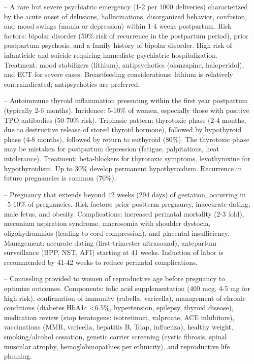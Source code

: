 -- A rare but severe psychiatric emergency (1-2 per 1000 deliveries) characterized by the acute onset of delusions, hallucinations, disorganized behavior, confusion, and mood swings (mania or depression) within 1-4 weeks postpartum. Risk factors: bipolar disorder (50\% risk of recurrence in the postpartum period), prior postpartum psychosis, and a family history of bipolar disorder. High risk of infanticide and suicide requiring immediate psychiatric hospitalization. Treatment: mood stabilizers (lithium), antipsychotics (olanzapine, haloperidol), and ECT for severe cases. Breastfeeding considerations: lithium is relatively contraindicated; antipsychotics are preferred.

-- Autoimmune thyroid inflammation presenting within the first year postpartum (typically 2-6 months). Incidence: 5-10\% of women, especially those with positive TPO antibodies (50-70\% risk). Triphasic pattern: thyrotoxic phase (2-4 months, due to destructive release of stored thyroid hormone), followed by hypothyroid phase (4-8 months), followed by return to euthyroid (80\%). The thyrotoxic phase may be mistaken for postpartum depression (fatigue, palpitations, heat intolerance). Treatment: beta-blockers for thyrotoxic symptoms, levothyroxine for hypothyroidism. Up to 30\% develop permanent hypothyroidism. Recurrence in future pregnancies is common (70\%).

-- Pregnancy that extends beyond 42 weeks (294 days) of gestation, occurring in ~5-10\% of pregnancies. Risk factors: prior postterm pregnancy, inaccurate dating, male fetus, and obesity. Complications: increased perinatal mortality (2-3 fold), meconium aspiration syndrome, macrosomia with shoulder dystocia, oligohydramnios (leading to cord compression), and placental insufficiency. Management: accurate dating (first-trimester ultrasound), antepartum surveillance (BPP, NST, AFI) starting at 41 weeks. Induction of labor is recommended by 41-42 weeks to reduce perinatal complications.

-- Counseling provided to women of reproductive age before pregnancy to optimize outcomes. Components: folic acid supplementation (400 mcg, 4-5 mg for high risk), confirmation of immunity (rubella, varicella), management of chronic conditions (diabetes HbA1c <6.5\%, hypertension, epilepsy, thyroid disease), medication review (stop teratogens: isotretinoin, valproate, ACE inhibitors), vaccinations (MMR, varicella, hepatitis B, Tdap, influenza), healthy weight, smoking/alcohol cessation, genetic carrier screening (cystic fibrosis, spinal muscular atrophy, hemoglobinopathies per ethnicity), and reproductive life planning.

